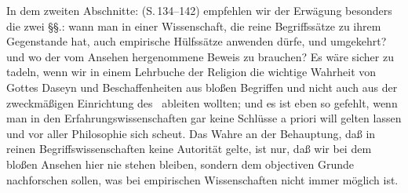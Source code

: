 In dem zweiten Abschnitte:  (S.\,134--142) empfehlen wir der Erwägung besonders die zwei §§.: wann man in einer Wissenschaft, die  reine Begriffssätze zu ihrem Gegenstande hat, auch empirische Hülfssätze anwenden dürfe, und umgekehrt? und wo der vom Ansehen hergenommene Beweis zu brauchen? Es wäre sicher zu tadeln, wenn wir in einem Lehrbuche der Religion die wichtige Wahrheit von Gottes Daseyn und Beschaffenheiten aus bloßen Begriffen und nicht auch aus der zweckmäßigen Einrichtung des  \usw\ ableiten wollten; und es ist eben so gefehlt, wenn man in den Erfahrungswissenschaften gar keine Schlüsse a priori will gelten lassen und vor aller Philosophie sich scheut. Das Wahre an der Behauptung, daß in reinen Begriffswissenschaften keine Autorität gelte, ist nur, daß wir bei dem bloßen Ansehen hier nie stehen bleiben, sondern dem objectiven Grunde nachforschen sollen, was bei empirischen Wissenschaften nicht immer möglich ist. \par 
